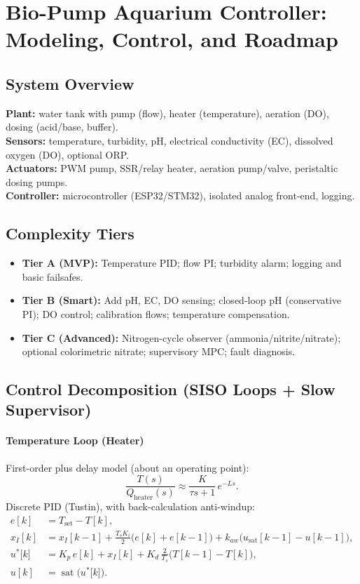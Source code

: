 \documentclass[11pt,a4paper]{article}
\begin{document}
	\section*{Bio-Pump Aquarium Controller: Modeling, Control, and Roadmap}
	
	\subsection*{System Overview}
	\textbf{Plant:} water tank with pump (flow), heater (temperature), aeration (DO), dosing (acid/base, buffer).\\
	\textbf{Sensors:} temperature, turbidity, pH, electrical conductivity (EC), dissolved oxygen (DO), optional ORP.\\
	\textbf{Actuators:} PWM pump, SSR/relay heater, aeration pump/valve, peristaltic dosing pumps.\\
	\textbf{Controller:} microcontroller (ESP32/STM32), isolated analog front-end, logging.
	
	\subsection*{Complexity Tiers}
	\begin{itemize}
		\item \textbf{Tier A (MVP):} Temperature PID; flow PI; turbidity alarm; logging and basic failsafes.
		\item \textbf{Tier B (Smart):} Add pH, EC, DO sensing; closed-loop pH (conservative PI); DO control; calibration flows; temperature compensation.
		\item \textbf{Tier C (Advanced):} Nitrogen-cycle observer (ammonia/nitrite/nitrate); optional colorimetric nitrate; supervisory MPC; fault diagnosis.
	\end{itemize}
	
	\subsection*{Control Decomposition (SISO Loops + Slow Supervisor)}
	\paragraph{Temperature Loop (Heater)}
	First-order plus delay model (about an operating point):
	$$
	\frac{T(s)}{Q_{\text{heater}}(s)} \approx \frac{K}{\tau s + 1}\,e^{-Ls}.
	$$
	Discrete PID (Tustin), with back-calculation anti-windup:
	$$
	\begin{aligned}
		e[k]   &= T_{\text{set}} - T[k],\\
		x_I[k] &= x_I[k{-}1] + \frac{T_s K_i}{2}\big(e[k] + e[k{-}1]\big) + k_{aw}\big(u_{\text{sat}}[k{-}1] - u[k{-}1]\big),\\
		u^{*} \big[k] &= K_p\,e[k] + x_I[k] + K_d\,\frac{2}{T_s}\big(T[k{-}1] - T[k]\big),\\
		u[k] &= \operatorname{sat}\!\big(u^{*}\big [k]\big).
	\end{aligned}
	$$
	
\end{document}
